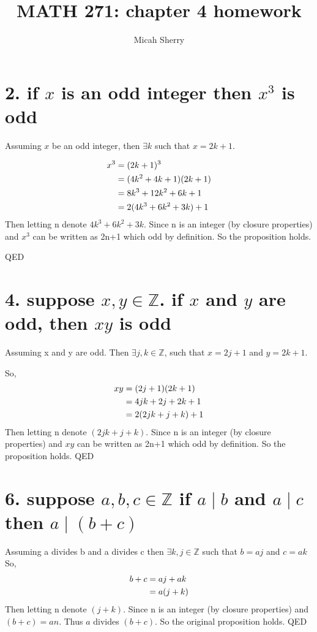 \documentclass{article}
\title{MATH 271: chapter 4 homework}
\author{Micah Sherry}
\begin{document}
\maketitle

\section*{2. if $x$ is an odd integer then $x^3$ is odd}	
	Assuming $x$ be an odd integer, then $\exists k $ such that $x=2k+1$.
	
	\begin{equation}\notag
	\begin{aligned}
	x^3 &= (2k+1)^3  \\
		&= (4k^2+4k+1)(2k+1)\\
		&= 8k^3+12k^2+6k+1\\
		&= 2(4k^3+6k^2+3k)+1
	\end{aligned}
	\end{equation}
	Then letting n denote $4k^3+6k^2+3k$. Since n is an integer (by closure properties) and $x^3$ can be written as 2n+1 which odd by definition. So the proposition holds. 
	
	\hfill QED
	
\section*{4. suppose $x , y\in \mathbb{Z}$. if $x$ and $y$ are odd, then $xy$ is odd}
Assuming x and y are odd. Then
$\exists j,k \in \mathbb{Z}$, such that $x=2j+1$ and $y=2k+1 $.

So, 	
\begin{equation}\notag
	\begin{aligned}
		xy  &= (2j+1)(2k+1)\\
			&= 4jk+2j+2k+1\\
			&= 2(2jk + j+ k) + 1
	\end{aligned}
\end{equation}
	Then letting n denote $(2jk + j+ k)$. Since n is an integer (by closure properties) and $xy$ can be written as 2n+1 which odd by definition. So the proposition holds. \hfill QED

\section*{6. suppose $a,b,c \in \mathbb{Z}$ if $a \mid b$ and $a \mid c$ then $a \mid (b+c)$}
Assuming a divides b and a divides c then $\exists k,j \in \mathbb{Z}$ such that $b=aj$ and $c=ak$
So, 
\begin{equation}\notag
	\begin{aligned}
	b+c &= aj+ak\\
		&= a(j+k)		
	\end{aligned}
\end{equation} 
Then letting n denote $(j+k)$. Since n is an integer (by closure properties) and $(b+c) = an$. Thus $a$ divides $(b + c)$. So the original proposition holds.  \hfill QED
\end{document}
